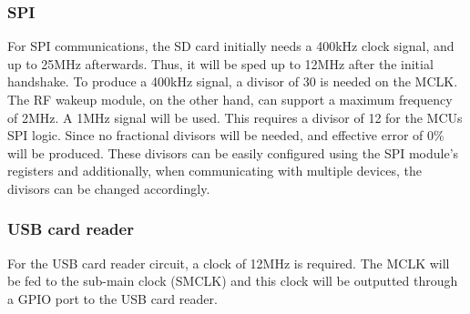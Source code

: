 \subsubsection{SPI}
For SPI communications, the SD card initially needs a 400kHz clock signal, and up to 25MHz afterwards. Thus, it will be sped up to 12MHz after the initial handshake. To produce a 400kHz signal, a divisor of 30 is needed on the MCLK. The RF wakeup module, on the other hand, can support a maximum frequency of 2MHz. A 1MHz signal will be used. This requires a divisor of 12 for the MCUs SPI logic. Since no fractional divisors will be needed, and effective error of 0\% will be produced. These divisors can be easily configured using the SPI module's registers and additionally, when communicating with multiple devices, the divisors can be changed accordingly.

\subsubsection{USB card reader}
For the USB card reader circuit, a clock of 12MHz is required. The MCLK will be fed to the sub-main clock (SMCLK) and this clock will be outputted through a GPIO port to the USB card reader.

